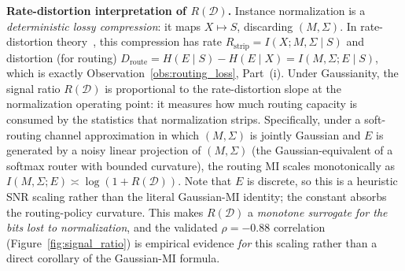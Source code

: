 \documentclass{article}
\begin{document}
\textbf{Rate-distortion interpretation of $R(\mathcal{D})$.}
Instance normalization is a \emph{deterministic lossy compression}: it maps $X \mapsto S$, discarding $(M, \Sigma)$. In rate-distortion theory~\citep{cover2006elements}, this compression has rate $R_\text{strip} = I(X; M, \Sigma \mid S)$ and distortion (for routing) $D_\text{route} = H(E \mid S) - H(E \mid X) = I(M, \Sigma; E \mid S)$, which is exactly Observation~\ref{obs:routing_loss}, Part~(i). Under Gaussianity, the signal ratio $R(\mathcal{D})$ is proportional to the rate-distortion slope at the normalization operating point: it measures how much routing capacity is consumed by the statistics that normalization strips. Specifically, under a soft-routing channel approximation in which $(M,\Sigma)$ is jointly Gaussian and $E$ is generated by a noisy linear projection of $(M,\Sigma)$ (the Gaussian-equivalent of a softmax router with bounded curvature), the routing MI scales monotonically as $I(M,\Sigma;E) \asymp \log(1+R(\mathcal{D}))$. Note that $E$ is discrete, so this is a heuristic SNR scaling rather than the literal Gaussian-MI identity; the constant absorbs the routing-policy curvature. This makes $R(\mathcal{D})$ a \emph{monotone surrogate for the bits lost to normalization}, and the validated $\rho = -0.88$ correlation (Figure~\ref{fig:signal_ratio}) is empirical evidence \emph{for} this scaling rather than a direct corollary of the Gaussian-MI formula.
\end{document}
